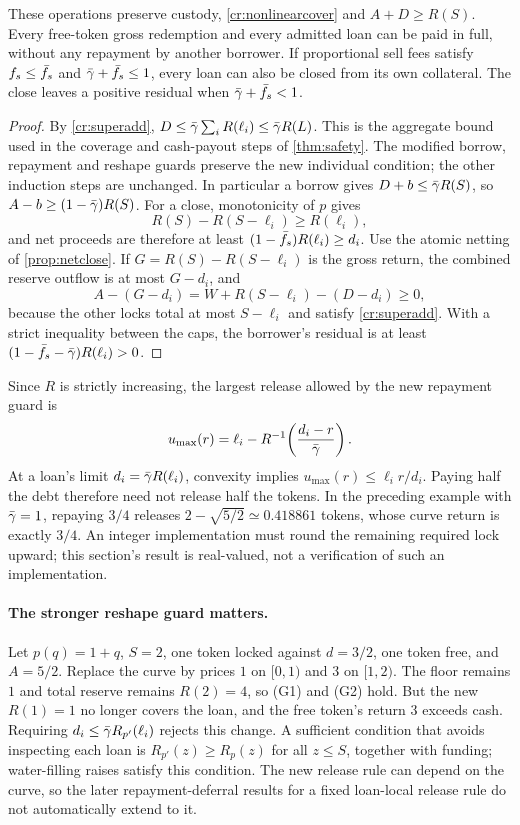 \begin{proposition}\label{cr:nonlinearsafety}
These operations preserve custody, \eqref{cr:nonlinearcover} and $A+D\ge R(S)$. Every free-token gross redemption and every admitted loan can be paid in full, without any repayment by another borrower. If proportional sell fees satisfy $f_s\le\bar f_s$ and $\bar\gamma+\bar f_s\le1$, every loan can also be closed from its own collateral. The close leaves a positive residual when $\bar\gamma+\bar f_s<1$.
\end{proposition}
\begin{proof}
By \eqref{cr:superadd}, $D\le\bar\gamma\sum_iR(\ell_i)\le\bar\gamma R(L)$. This is the aggregate bound used in the coverage and cash-payout steps of \cref{thm:safety}. The modified borrow, repayment and reshape guards preserve the new individual condition; the other induction steps are unchanged. In particular a borrow gives $D+b\le\bar\gamma R(S)$, so $A-b\ge(1-\bar\gamma)R(S)$. For a close, monotonicity of $p$ gives
\[
R(S)-R(S-\ell_i)\ge R(\ell_i),
\]
and net proceeds are therefore at least $(1-\bar f_s)R(\ell_i)\ge d_i$. Use the atomic netting of \cref{prop:netclose}. If $G=R(S)-R(S-\ell_i)$ is the gross return, the combined reserve outflow is at most $G-d_i$, and
\[
A-(G-d_i)=W+R(S-\ell_i)-(D-d_i)\ge0,
\]
because the other locks total at most $S-\ell_i$ and satisfy \eqref{cr:superadd}. With a strict inequality between the caps, the borrower's residual is at least $(1-\bar f_s-\bar\gamma)R(\ell_i)>0$.
\end{proof}

Since $R$ is strictly increasing, the largest release allowed by the new repayment guard is
\begin{equation}\label{cr:maxrelease}
u_{\max}(r)=\ell_i-R^{-1}\!\left(\frac{d_i-r}{\bar\gamma}\right).
\end{equation}
At a loan's limit $d_i=\bar\gamma R(\ell_i)$, convexity implies $u_{\max}(r)\le\ell_i r/d_i$. Paying half the debt therefore need not release half the tokens. In the preceding example with $\bar\gamma=1$, repaying $3/4$ releases $2-\sqrt{5/2}\simeq0.418861$ tokens, whose curve return is exactly $3/4$. An integer implementation must round the remaining required lock upward; this section's result is real-valued, not a verification of such an implementation.

\paragraph{The stronger reshape guard matters.}
Let $p(q)=1+q$, $S=2$, one token locked against $d=3/2$, one token free, and $A=5/2$. Replace the curve by prices $1$ on $[0,1)$ and $3$ on $[1,2)$. The floor remains $1$ and total reserve remains $R(2)=4$, so (G1) and (G2) hold. But the new $R(1)=1$ no longer covers the loan, and the free token's return $3$ exceeds cash. Requiring $d_i\le\bar\gamma R_{p'}(\ell_i)$ rejects this change. A sufficient condition that avoids inspecting each loan is $R_{p'}(z)\ge R_p(z)$ for all $z\le S$, together with funding; water-filling raises satisfy this condition. The new release rule can depend on the curve, so the later repayment-deferral results for a fixed loan-local release rule do not automatically extend to it.

